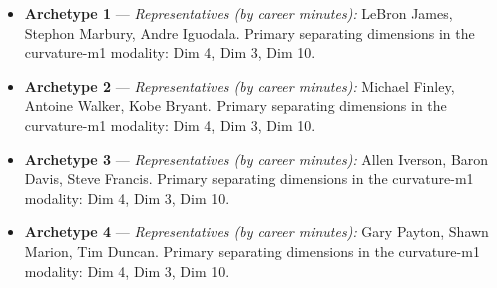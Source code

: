 \begin{itemize}
\item \textbf{Archetype 1} --- \emph{Representatives (by career minutes):} LeBron James, Stephon Marbury, Andre Iguodala. Primary separating dimensions in the curvature-m1 modality: Dim 4, Dim 3, Dim 10.
\item \textbf{Archetype 2} --- \emph{Representatives (by career minutes):} Michael Finley, Antoine Walker, Kobe Bryant. Primary separating dimensions in the curvature-m1 modality: Dim 4, Dim 3, Dim 10.
\item \textbf{Archetype 3} --- \emph{Representatives (by career minutes):} Allen Iverson, Baron Davis, Steve Francis. Primary separating dimensions in the curvature-m1 modality: Dim 4, Dim 3, Dim 10.
\item \textbf{Archetype 4} --- \emph{Representatives (by career minutes):} Gary Payton, Shawn Marion, Tim Duncan. Primary separating dimensions in the curvature-m1 modality: Dim 4, Dim 3, Dim 10.
\end{itemize}
